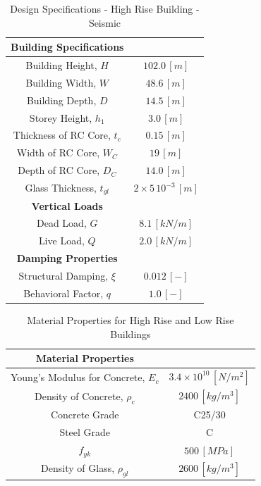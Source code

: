 \documentclass[11pt,a4paper,titlepage]{report}
\begin{document}
\begin{table}[h!]
  \begin{center}
    \begin{tabular}{c|c}
    \hline
      \textbf{Building Specifications}\\
      \hline
      Building Height, $H$ & $102.0\,[m]$\\
      Building Width, $W$ & $48.6\, [m]$\\
      Building Depth, $D$ & $14.5\, [m]$\\
      Storey Height, $h_1$ & $3.0\, [m]$\\
      Thickness of RC Core, $t_c$ & $0.15\, [m]$ \\
      Width of RC Core, $W_C$ & $19\, [m]$\\
      Depth of RC Core, $D_C$ & $14.0\, [m]$\\
      Glass Thickness, $t_{gl}$ & $2\times5\,10^{-3}\,[m]$\\
      \hline
       \textbf{Vertical Loads}\\
      \hline
        Dead Load, $G$ & $8.1\,[kN/m]$\\
        Live Load, $Q$ & $2.0\,[kN/m]$\\
       \hline
       \textbf{Damping Properties}\\
         \hline
          Structural Damping, $\xi$ & $0.012\,[-]$\\
          Behavioral Factor, $q$ & $1.0\,[-]$
    \end{tabular}
     \caption{Design Specifications - High Rise Building - Seismic}
    \label{tab: Specifications - Design HighRB}
  \end{center}
\end{table}
\begin{table}[h!]
  \begin{center}
    \begin{tabular}{c|c}
    \hline
      \textbf{Material Properties}\\
      \hline
      Young's Modulus for Concrete, $E_c$ & $3.4\times10^{10}\,[N/m^2]$\\
      Density of Concrete, $\rho_{c}$ & $2400\,[kg/m^3]$ \\
      Concrete Grade & C25/30\\
      Steel Grade & C\\
      $f_{yk}$ & $500\,[MPa]$\\
      Density of Glass, $\rho_{gl}$ & $2600\,[kg/m^3]$ \\
       \end{tabular}
       \caption{Material Properties for High Rise and Low Rise Buildings}
    \label{tab: specifications - material properties}
  \end{center}
\end{table}
\end{document}
